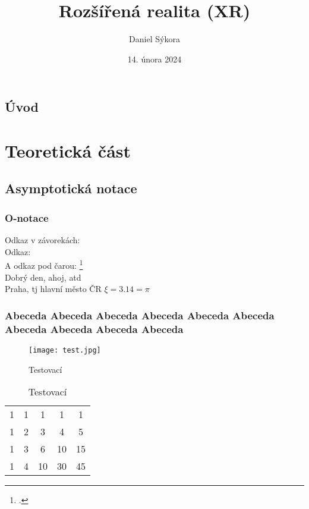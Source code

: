 \documentclass[12pt]{report}
\author{Daniel Sýkora}
\title{Rozšířená realita (XR)}
\date{14. února 2024}
\begin{document}
\mytitlepage


\abstrakt{
	\lipsum[1]
}{
	\lipsum[1]
}

\podekovani{
	\lipsum[2]
}

\tableofcontents
\newpage




\chapter*{Úvod}

\lipsum[1]


\part{Teoretická část}

\chapter{Asymptotická notace}

\section{O-notace}
Odkaz v závorekách: \cite[see][page 900]{einstein}\\
Odkaz: \cite{knuthwebsite}\\
A odkaz pod čarou: \footcite[see][s. 42]{latexcompanion}\\
Dobrý den, ahoj, \gls{atd}\\
Praha, \gls{tj} hlavní město ČR
$\xi = 3.14 = \pi$

\section{Abeceda Abeceda Abeceda Abeceda Abeceda Abeceda Abeceda Abeceda Abeceda Abeceda }
\begin{figure}
	\texttt{[image: test.jpg]}
	\caption{Testovací}
	\label{fig:test}
\end{figure}
\begin{table}
	\caption{Testovací}
	\label{tab:test2}
	\begin{tabular}{ccccc}
		1 & 1 & 1  & 1  & 1  \\
		1 & 2 & 3  & 4  & 5  \\
		1 & 3 & 6  & 10 & 15 \\
		1 & 4 & 10 & 30 & 45
	\end{tabular}
\end{table}
\end{document}
